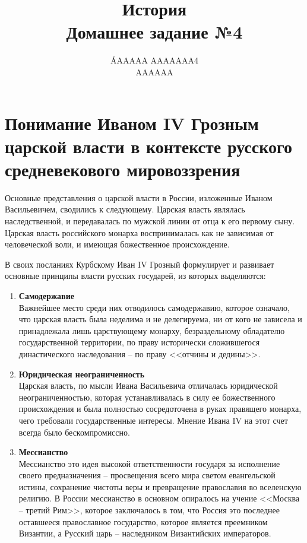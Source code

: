 \documentclass[12pt]{article}
\title{История \\ Домашнее задание №4}
\author{\AA{AAAAA AAAAAAA}{4} \\ AAAAAA}
\newcommand{\red}[1]{{\color{red}{#1}}}
\begin{document}
  \maketitle
  \setcounter{section}{1}

  \section{Понимание Иваном IV Грозным царской власти в контексте русского средневекового мировоззрения}

  Основные представления о царской власти в России, изложенные Иваном Васильевичем, сводились к следующему.
  Царская власть являлась наследственной, и передавалась по мужской линии от отца к его первому сыну.
  Царская власть российского монарха воспринималась как не зависимая от человеческой воли, и имеющая божественное происхождение.

  В своих посланиях Курбскому Иван IV Грозный формулирует и развивает основные принципы власти русских государей, из которых выделяются:

  \begin{enumerate}[label=\textbf{\large\arabic*}]
    \item {\bf\large Самодержавие} \\
    Важнейшее место среди них отводилось самодержавию, которое означало,
    что царская власть была неделима и не делегируема, ни от кого не зависела и принадлежала лишь царствующему монарху,
    безраздельному обладателю государственной территории,
    по праву исторически сложившегося династического наследования -- по праву <<отчины и дедины>>.

    \item {\bf\large Юридическая неограниченность} \\
    Царская власть, по мысли Ивана Васильевича отличалась юридической неограниченностью,
    которая устанавливалась в силу ее божественного происхождения и была полностью сосредоточена в руках правящего монарха,
    чего требовали государственные интересы.
    Мнение Ивана IV на этот счет всегда было бескомпромиссно.

    \item {\bf\large Мессианство} \\
    Мессианство это идея высокой ответственности государя за исполнение своего предназначения --
    просвещения всего мира светом евангельской истины, сохранение чистоты веры и превращение православия во вселенскую религию.
    В России мессианство в основном опиралось на учение <<Москва -- третий Рим>>, которое заключалось в том, что
    Россия это последнее оставшееся православное государство, которое является преемником Византии,
    а Русский царь -- наследником Византийских императоров.
  \end{enumerate}
\end{document}
